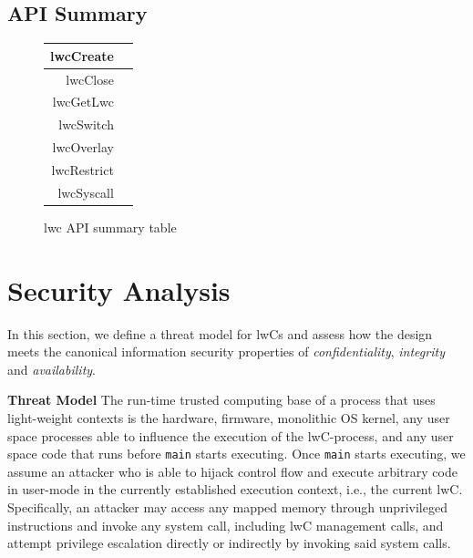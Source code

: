\documentclass[10pt,twocolumn,a4paper]{article}
\begin{document}
\subsection{API Summary}

\begin{figure}[h] %
\centering
\begin{tabular}{|r|m{1.5cm}|}
  \hline
  lwcCreate & \\
  \hline
  lwcClose & \\
  \hline
  lwcGetLwc & \\
  \hline
  lwcSwitch &  \\
  \hline
  lwcOverlay & \\
  \hline
  lwcRestrict & \\
  \hline
  lwcSyscall & \\
  \hline
\end{tabular}
  \caption{lwc API summary table}
\end{figure}


\section{Security Analysis}\label{security}

In this section, we define a threat model for lwCs and assess how the design meets the canonical information security properties of \textit{confidentiality}, \textit{integrity} and \textit{availability}\cite{ciagoals}.

\textbf{Threat Model}\hspace{1em}
The run-time trusted computing base of a process that uses light-weight contexts is the
hardware,
firmware,
monolithic OS kernel,
any user space processes able to influence the execution of the lwC-process,
and any user space code that runs before \lstinline{main} starts executing.
Once \lstinline{main} starts executing, we assume an attacker who is able to hijack control flow and execute arbitrary code in user-mode in the currently established execution context, i.e., the current lwC.
Specifically, an attacker may access any mapped memory through unprivileged instructions and invoke any system call, including lwC management calls, and attempt privilege escalation directly or indirectly by invoking said system calls.
\cite{lwcpaper}
\end{document}
